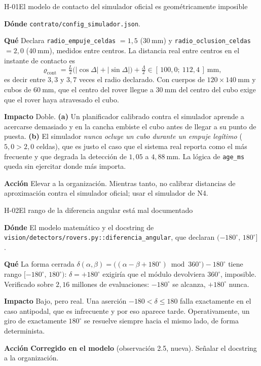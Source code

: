 \documentclass[11pt,a4paper]{article}
\newcommand{\grados}{^{\circ}}
\newcommand{\campo}[1]{\par\smallskip\noindent\textbf{#1}\quad\ignorespaces}
\begin{document}
\begin{hallazgo}{H-01}{El modelo de contacto del simulador oficial es geométricamente imposible}
\campo{Dónde} \texttt{contrato/config\_simulador.json}.
\campo{Qué} Declara \texttt{radio\_empuje\_celdas} $=1{,}5$ ($30\ \mathrm{mm}$) y
\texttt{radio\_oclusion\_celdas} $=2{,}0$ ($40\ \mathrm{mm}$), medidos entre centros. La
distancia real entre centros en el instante de contacto es
\[
  \varrho_{\mathrm{cont}} = \tfrac{L}{2}\big(|\cos\Delta|+|\sin\Delta|\big) + \tfrac{\Lambda}{2}
  \in [\,100{,}0;\ 112{,}4\,]\ \mathrm{mm},
\]
es decir entre $3{,}3$ y $3{,}7$ veces el radio declarado. Con cuerpos de
$120\times140\ \mathrm{mm}$ y cubos de $60\ \mathrm{mm}$, que el centro del rover llegue
a $30\ \mathrm{mm}$ del centro del cubo exige que el rover haya atravesado el cubo.
\campo{Impacto} Doble. \textbf{(a)} Un planificador calibrado contra el simulador
aprende a acercarse demasiado y en la cancha embiste el cubo antes de llegar a su punto
de puesta. \textbf{(b)} El simulador \emph{nunca ocluye un cubo durante un empuje
legítimo} ($5{,}0 > 2{,}0$ celdas), que es justo el caso que el sistema real reporta como
el más frecuente y que degrada la detección de $1{,}05$ a $4{,}88\ \mathrm{mm}$. La
lógica de \texttt{age\_ms} queda sin ejercitar donde más importa.
\campo{Acción} Elevar a la organización. Mientras tanto, no calibrar distancias de
aproximación contra el simulador oficial; usar el simulador de N4.
\end{hallazgo}

\begin{hallazgo}{H-02}{El rango de la diferencia angular está mal documentado}
\campo{Dónde} El modelo matemático y el docstring de
\texttt{vision/detectors/rovers.py::diferencia\_angular}, que declaran
$(-180\grados,\,180\grados]$.
\campo{Qué} La forma cerrada
$\delta(\alpha,\beta)=\big((\alpha-\beta+180\grados)\bmod 360\grados\big)-180\grados$
tiene rango $[-180\grados,\,180\grados)$: $\delta=+180\grados$ exigiría que el módulo
devolviera $360\grados$, imposible. Verificado sobre $2{,}16$ millones de evaluaciones:
$-180\grados$ se alcanza, $+180\grados$ nunca.
\campo{Impacto} Bajo, pero real. Una aserción $-180 < \delta \le 180$ falla exactamente
en el caso antipodal, que es infrecuente y por eso aparece tarde. Operativamente, un
giro de exactamente $180\grados$ se resuelve siempre hacia el mismo lado, de forma
determinista.
\campo{Acción} \textbf{Corregido en el modelo} (observación 2.5, nueva). Señalar el
docstring a la organización.
\end{hallazgo}
\end{document}
